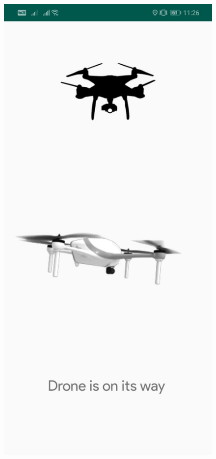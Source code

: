 \begin{figure}[H]
    \includegraphics[scale=0.17]{SummerInterReport/project/Images-Major/app2.jpeg}

\end{figure}
